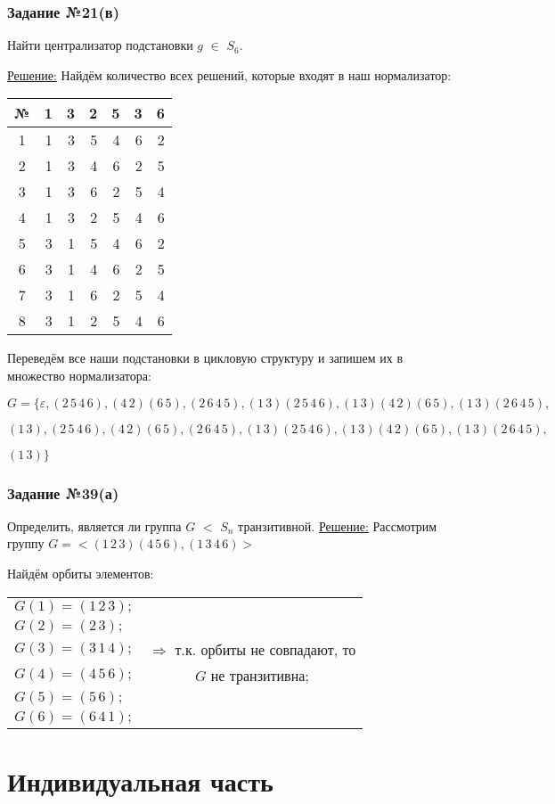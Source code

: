 \documentclass[utf8,14pt,a4paper,oneside,russian]{book}
\begin{document}
	\subsubsection{Задание №21(в)}
	Найти централизатор подстановки $g$ $\in$ $S_{6}$.
	
	\underline{Решение:} Найдём количество всех решений, которые входят в наш нормализатор:
	
	\begin{longtable}{c|rr|rrrr}
		№&1&3&2&5&3&6\\\hline
		1&1&3&5&4&6&2\\
		2&1&3&4&6&2&5\\
		3&1&3&6&2&5&4\\
		4&1&3&2&5&4&6\\
		5&3&1&5&4&6&2\\
		6&3&1&4&6&2&5\\
		7&3&1&6&2&5&4\\
		8&3&1&2&5&4&6
	\end{longtable}
	
	Переведём все наши подстановки в цикловую структуру и запишем их в множество нормализатора:
	
	$G=\{\varepsilon,(2\,5\,4\,6),(4\,2)(6\,5),(2\,6\,4\,5),(1\,3)(2\,5\,4\,6),(1\,3)(4\,2)(6\,5),(1\,3)(2\,6\,4\,5),$
	
	$(1\,3),(2\,5\,4\,6),(4\,2)(6\,5),(2\,6\,4\,5),(1\,3)(2\,5\,4\,6),(1\,3)(4\,2)(6\,5),(1\,3)(2\,6\,4\,5),$
	
	$(1\,3)\}$
	
	\subsubsection{Задание №39(а)}
	Определить, является ли группа $G$ $<$ $S_{n}$ транзитивной.
	\underline{Решение:} Рассмотрим группу $G=<(1\,2\,3)(4\,5\,6),(1\,3\,4\,6)>$
	
	Найдём орбиты элементов:
	\begin{longtable}{l|c}
		$G(1)=(1\,2\,3);$&\\
		$G(2)=(2\,3);$&\\
		$G(3)=(3\,1\,4);$&$\Rightarrow$ т.к. орбиты не совпадают, то\\
		$G(4)=(4\,5\,6);$&$G$ не транзитивна;\\
		$G(5)=(5\,6);$&\\
		$G(6)=(6\,4\,1);$&
	\end{longtable}
	
	\newpage
	
	\section{Индивидуальная часть}
\end{document}
